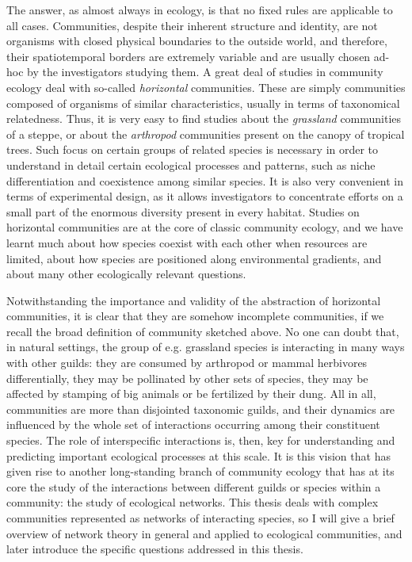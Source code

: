 The answer, as almost always in ecology, is that no fixed rules are applicable to all cases. Communities, despite their inherent structure and identity, are not organisms with closed physical boundaries to the outside world, and therefore, their spatiotemporal borders are extremely variable and are usually chosen ad-hoc by the investigators studying them. A great deal of studies in community ecology deal with so-called \textit{horizontal} communities. These are simply communities composed of organisms of similar characteristics, usually in terms of taxonomical relatedness. Thus, it is very easy to find studies about the \textit{grassland} communities of a steppe, or about the \textit{arthropod} communities present on the canopy of tropical trees. Such focus on certain groups of related species is necessary in order to understand in detail certain ecological processes and patterns, such as niche differentiation and coexistence among similar species. It is also very convenient in terms of experimental design, as it allows investigators to concentrate efforts on a small part of the enormous diversity present in every habitat. Studies on horizontal communities are at the core of classic community ecology, and we have learnt much about how species coexist with each other when resources are limited, about how species are positioned along environmental gradients, and about many other ecologically relevant questions.

Notwithstanding the importance and validity of the abstraction of horizontal communities, it is clear that they are somehow incomplete communities, if we recall the broad definition of community sketched above. No one can doubt that, in natural settings, the group of e.g. grassland species is interacting in many ways with other guilds: they are consumed by arthropod or mammal herbivores differentially, they may be pollinated by other sets of species, they may be affected by stamping of big animals or be fertilized by their dung. All in all, communities are more than disjointed taxonomic guilds, and their dynamics are influenced by the whole set of interactions occurring among their constituent species. The role of interspecific interactions is, then, key for understanding and predicting important ecological processes at this scale. It is this vision that has given rise to another long-standing branch of community ecology that has at its core the study of the interactions between different guilds or species within a community: the study of ecological networks. This thesis deals with complex communities represented as networks of interacting species, so I will give a brief overview of network theory in general and applied to ecological communities, and later introduce the specific questions addressed in this thesis.

